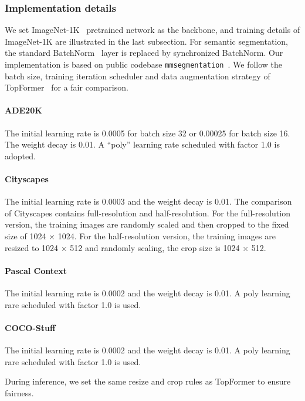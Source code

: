 \subsubsection{Implementation details}
We set ImageNet-1K~\cite{deng2009imagenet} pretrained network as the backbone, and training details of ImageNet-1K are illustrated in the last subsection. 
For semantic segmentation, the standard BatchNorm~\cite{ioffe2015batch} layer is replaced by synchronized BatchNorm.
Our implementation is based on public codebase \texttt{mmsegmentation}~\cite{contributors2020mmsegmentation}.
We follow the batch size, training iteration scheduler and data augmentation strategy of TopFormer~\cite{zhang2022topformer} for a fair comparison.

\paragraph{ADE20K} The initial learning rate is 0.0005 for batch size 32 or 0.00025 for batch size 16. The weight decay is 0.01. 
A “poly” learning rate scheduled with factor 1.0 is adopted.

\paragraph{Cityscapes} The initial learning rate is 0.0003 and the weight decay is 0.01.
The comparison of Cityscapes contains full-resolution and half-resolution.
For the full-resolution version, the training images are randomly scaled and then cropped to the fixed size of 1024 × 1024. 
For the half-resolution version, the training images are resized to 1024 × 512 and randomly scaling, the crop size is 1024 × 512. 

\paragraph{Pascal Context} The initial learning rate is 0.0002 and the weight decay is 0.01. A poly learning rare scheduled with factor 1.0 is used. 

\paragraph{COCO-Stuff} The initial learning rate is 0.0002 and the weight decay is 0.01. A poly learning rare scheduled with factor 1.0 is used. 

During inference, we set the same resize and crop rules as TopFormer to ensure fairness.

